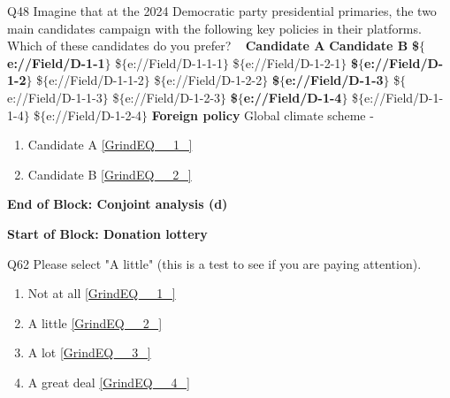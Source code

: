 \documentclass{article} %
\begin{document}
\eject 

\noindent 

\noindent Q48 Imagine that at the 2024 Democratic party presidential primaries, the two main candidates campaign with the following key policies in their platforms. Which of these candidates do you prefer?       ~  \textbf{Candidate A}  \textbf{Candidate B}   \textbf{\$$\boldsymbol{\mathrm{\{}}$e://Field/D-1-1$\boldsymbol{\mathrm{\}}}$} \$$\mathrm{\{}$e://Field/D-1-1-1$\mathrm{\}}$ \$$\mathrm{\{}$e://Field/D-1-2-1$\mathrm{\}}$  \textbf{\$$\boldsymbol{\mathrm{\{}}$e://Field/D-1-2$\boldsymbol{\mathrm{\}}}$} \$$\mathrm{\{}$e://Field/D-1-1-2$\mathrm{\}}$ \$$\mathrm{\{}$e://Field/D-1-2-2$\mathrm{\}}$  \textbf{\$$\boldsymbol{\mathrm{\{}}$e://Field/D-1-3$\boldsymbol{\mathrm{\}}}$} \$$\mathrm{\{}$e://Field/D-1-1-3$\mathrm{\}}$ \$$\mathrm{\{}$e://Field/D-1-2-3$\mathrm{\}}$  \textbf{\$$\boldsymbol{\mathrm{\{}}$e://Field/D-1-4$\boldsymbol{\mathrm{\}}}$} \$$\mathrm{\{}$e://Field/D-1-1-4$\mathrm{\}}$ \$$\mathrm{\{}$e://Field/D-1-2-4$\mathrm{\}}$      \textbf{Foreign policy}     Global climate scheme     -       

\begin{enumerate}
\item  Candidate A  \eqref{GrindEQ__1_} 

\item  Candidate B  \eqref{GrindEQ__2_} 
\end{enumerate}

\noindent 

\noindent \textbf{End of Block: Conjoint analysis (d)}

\noindent \textbf{}

\noindent \textbf{Start of Block: Donation lottery}

\noindent 

\noindent Q62 Please select "A little" (this is a test to see if you are paying attention).

\begin{enumerate}
\item  Not at all  \eqref{GrindEQ__1_} 

\item  A little  \eqref{GrindEQ__2_} 

\item  A lot  \eqref{GrindEQ__3_} 

\item  A great deal  \eqref{GrindEQ__4_} 
\end{enumerate}

\noindent 
\end{document}

